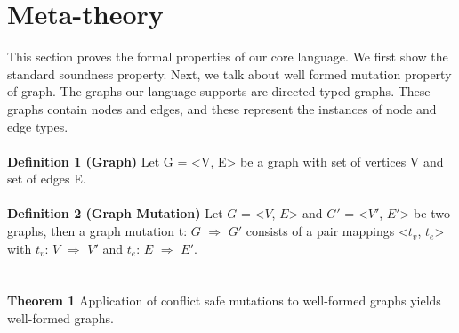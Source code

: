 \section{Meta-theory}
\label{sec:soundness}

This section proves the formal properties of our core language. We first show the standard soundness property. Next, we talk about well formed mutation property of graph. The graphs our language supports are directed typed graphs. These graphs contain nodes and edges, and these represent the instances of node and edge types.\\
\ \\ 
\textbf{Definition 1 (Graph)} Let G = <V, E> be a graph with set of vertices V and set of edges E.\\
\ \\
\textbf{Definition 2 (Graph Mutation)} Let $G$ = <$V$, $E$>  and $G'$ = <$V'$, $E'$> be two graphs, then a graph mutation t: $G$ $\Rightarrow$ $G'$ consists of a pair mappings <$t_v$, $t_e$> with $t_v$: $V$ $\Rightarrow$ $V'$ and $t_e$: $E$ $\Rightarrow$ $E'$.\ \\
\ \\
\ \\
\textbf{Theorem 1} Application of conflict safe mutations to well-formed graphs yields well-formed graphs.\\


